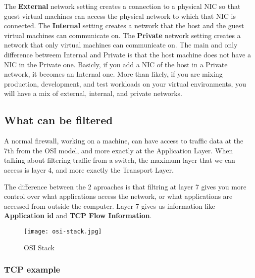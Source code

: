 \vspace{5mm}
The \textbf{External} network setting creates a connection to a physical NIC so that guest virtual machines can access the physical network to which that NIC is connected. 
The \textbf{Internal} setting creates a network that the host and the guest virtual machines can communicate on. The \textbf{Private} network setting creates a network that only virtual 
machines can communicate on. The main and only difference betweem Internal and Private is that the host machine does not have a NIC in the Private one. Basicly, if you add a NIC of the 
host in a Private network, it becomes an Internal one. More than likely, if you are mixing production, development, and test workloads on your virtual environments, you will have a mix 
of external, internal, and private networks.

\subsection{What can be filtered}

\vspace{5mm}

A normal firewall, working on a machine, can have access to traffic data at the 7th from the OSI model, and more exactly at the Application Layer.
When talking about filtering traffic from a switch, the maximum layer that we can access is layer 4, and more exactly the Transport Layer.

\vspace{5mm}

The difference between the 2 aproaches is that filtring at layer 7 gives you more control over what applications access the network, or what applications
are accessed from outside the computer. Layer 7 gives us information like \textbf{Application id} and \textbf{TCP Flow Information}.

\vspace{5mm}

\begin{figure}[h]
\centering
\texttt{[image: osi-stack.jpg]}
\caption{OSI Stack}
\label{osi-stack}
\end{figure}

\vspace{5mm}
\subsubsection{TCP example}
\vspace{5mm}

